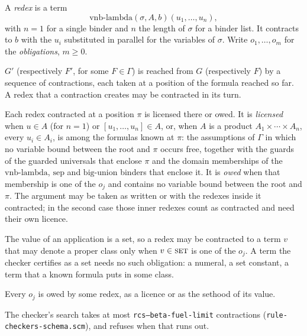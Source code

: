 A \emph{redex} is a term
\[
  \mathrm{vnb\text{-}lambda}(\sigma, A, b)(u_1, \ldots, u_n),
\]
with $n = 1$ for a single binder and $n$ the length of $\sigma$ for a
binder list.  It contracts to $b$ with the $u_i$ substituted in parallel
for the variables of $\sigma$.  Write $o_1, \ldots, o_m$ for the
\emph{obligations}, $m \geq 0$.
\label{kop:lambda-beta}%
\label{kop:lambda-beta-hyp}%
\begin{VNBcond}
\item[Contraction] $G'$ (respectively $F'$, for some $F \in \Gamma$) is
  reached from $G$ (respectively $F$) by a sequence of contractions,
  each taken at a position of the formula reached so far.  A redex that
  a contraction creates may be contracted in its turn.
\item[Licence] Each redex contracted at a position $\pi$ is licensed
  there or owed.  It is \emph{licensed} when $u \in A$ (for $n = 1$) or
  $[u_1, \ldots, u_n] \in A$, or, when $A$ is a product
  $A_1 \times \cdots \times A_n$, every $u_i \in A_i$, is among the
  formulas known at $\pi$: the assumptions of $\Gamma$ in which no
  variable bound between the root and $\pi$ occurs free, together with
  the guards of the guarded universals that enclose $\pi$ and the domain
  memberships of the $\mathrm{vnb\text{-}lambda}$, $\mathrm{sep}$ and
  $\mathrm{big\text{-}union}$ binders that enclose it.  It is
  \emph{owed} when that membership is one of the $o_j$ and contains no
  variable bound between the root and $\pi$.  The argument may be taken
  as written or with the redexes inside it contracted; in the second
  case those inner redexes count as contracted and need their own
  licence.
\item[Value] The value of an application is a set, so a redex may be
  contracted to a term $v$ that may denote a proper class only when
  $v \in \textsc{set}$ is one of the $o_j$.  A term the checker
  certifies as a set needs no such obligation: a numeral, a set
  constant, a term that a known formula puts in some class.
\item[Obligations] Every $o_j$ is owed by some redex, as a licence or
  as the sethood of its value.
\item[Bound] The checker's search takes at most
  \texttt{rcs--beta-fuel-limit} contractions (\texttt{rule-checkers-schema.scm}),
  and refuses when that runs out.
\end{VNBcond}
